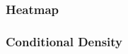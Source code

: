 \documentclass[12pt,handout]{beamer}
\begin{document}
\begin{frame}
\frametitle{Heatmap}
\begin{center}
\end{center}
\end{frame}

\begin{frame}
\frametitle{Conditional Density}
\begin{center}
\end{center}
\end{frame}
\end{document}
